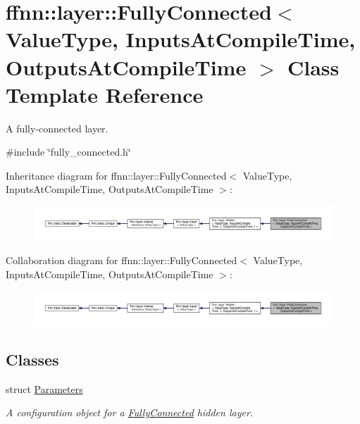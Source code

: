 \hypertarget{classffnn_1_1layer_1_1_fully_connected}{\section{ffnn\-:\-:layer\-:\-:Fully\-Connected$<$ Value\-Type, Inputs\-At\-Compile\-Time, Outputs\-At\-Compile\-Time $>$ Class Template Reference}
\label{classffnn_1_1layer_1_1_fully_connected}
}


A fully-\/connected layer.  




{\ttfamily \#include \char`\"{}fully\-\_\-connected.\-h\char`\"{}}



Inheritance diagram for ffnn\-:\-:layer\-:\-:Fully\-Connected$<$ Value\-Type, Inputs\-At\-Compile\-Time, Outputs\-At\-Compile\-Time $>$\-:\nopagebreak
\begin{figure}[H]
\begin{center}
\leavevmode
\includegraphics[width=350pt]{classffnn_1_1layer_1_1_fully_connected__inherit__graph}
\end{center}
\end{figure}


Collaboration diagram for ffnn\-:\-:layer\-:\-:Fully\-Connected$<$ Value\-Type, Inputs\-At\-Compile\-Time, Outputs\-At\-Compile\-Time $>$\-:
\nopagebreak
\begin{figure}[H]
\begin{center}
\leavevmode
\includegraphics[width=350pt]{classffnn_1_1layer_1_1_fully_connected__coll__graph}
\end{center}
\end{figure}
\subsection*{Classes}
\begin{DoxyCompactItemize}
\item 
struct \hyperlink{structffnn_1_1layer_1_1_fully_connected_1_1_parameters}{Parameters}
\begin{DoxyCompactList}\small\item\em A configuration object for a \hyperlink{classffnn_1_1layer_1_1_fully_connected}{Fully\-Connected} hidden layer. \end{DoxyCompactList}\end{DoxyCompactItemize}

